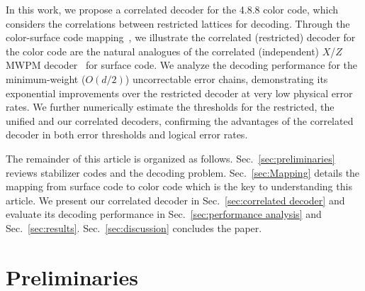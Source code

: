 \documentclass[%
 reprint,
 amsmath,amssymb,
 aps,
]{revtex4-2}
\begin{document}
In this work, we propose a correlated decoder for the 4.8.8 color code, which considers the correlations between restricted lattices for decoding. Through the color-surface code mapping~\cite{yoshida2011classification, bombin2012universal, Bhagoji15, Kubica_2015, criger2016noise, benhemou2025minimising}, we illustrate the correlated (restricted) decoder for the color code are the natural analogues of the correlated (independent) $X$/$Z$ MWPM decoder~\cite{delfosse2014decoding_sc, fowler2013optimal} for surface code. We analyze the decoding performance for the minimum-weight ($O(d/2)$) uncorrectable error chains, demonstrating its exponential improvements over the restricted decoder at very low physical error rates. We further numerically estimate the thresholds for the restricted, the unified and our correlated decoders, confirming the advantages of the correlated decoder in both error thresholds and logical error rates.  

The remainder of this article is organized as follows. Sec.~\ref{sec:preliminaries} reviews stabilizer codes and the decoding problem. Sec.~\ref{sec:Mapping} details the mapping from surface code to color code which is the key to understanding this article. We present our correlated decoder in Sec.~\ref{sec:correlated decoder} and evaluate its decoding performance in Sec.~\ref{sec:performance analysis} and Sec.~\ref{sec:results}. Sec.~\ref{sec:discussion} concludes the paper.


\section{\label{sec:preliminaries}Preliminaries}
\end{document}
